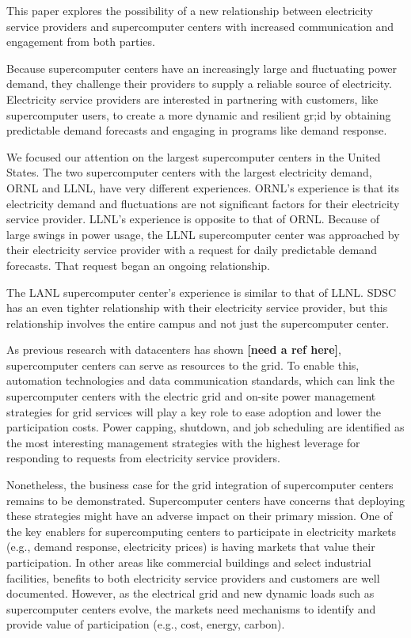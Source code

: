 This paper explores the possibility of a new relationship between electricity service providers
and supercomputer centers with increased communication and engagement from both parties.

Because supercomputer centers have an increasingly large and fluctuating
power demand, they challenge their providers to supply a reliable
source of electricity.
Electricity service providers are interested in partnering with customers,
like supercomputer users, to create a more dynamic and resilient gr;id
by obtaining predictable demand forecasts and engaging in programs like 
demand response.

We focused our attention on the largest supercomputer centers in the United States. The two supercomputer 
centers with the largest electricity demand, ORNL and LLNL, have very different experiences.  
ORNL's experience is that its electricity demand and fluctuations are not significant factors for their 
electricity service provider.  
LLNL's experience is opposite to that of ORNL.  Because of large swings in 
power usage, the LLNL supercomputer center was approached by their electricity service provider with a 
request for daily predictable demand forecasts. That request began an ongoing relationship.  

The LANL supercomputer center's experience is similar to that of LLNL. SDSC has an even tighter relationship 
with their electricity service provider, but this relationship involves the entire campus and not just the 
supercomputer center.  

As previous research with datacenters has shown \textbf{[need a ref here]}, supercomputer centers can serve as   
resources to the grid. To enable this, automation technologies and data communication standards, 
which can link the supercomputer centers with the electric grid and on-site power management strategies 
for grid services will play a key role to ease adoption and lower the participation costs.  Power capping, 
shutdown, and job scheduling are identified as the most interesting management strategies with the highest 
leverage for responding to requests from electricity service providers.  

Nonetheless, the business case for the grid integration of supercomputer centers remains to be demonstrated.  
Supercomputer centers have concerns that deploying these strategies might have an adverse impact on 
their primary mission. One of the key enablers for supercomputing centers to participate in 
electricity markets (e.g., demand response, electricity prices) is having markets that value their 
participation. In other areas like commercial buildings and select industrial facilities, benefits to 
both electricity service providers and customers are well documented. However, as the electrical grid 
and new dynamic loads such as supercomputer centers evolve, the markets need mechanisms to identify 
and provide value of participation (e.g., cost, energy, carbon).

